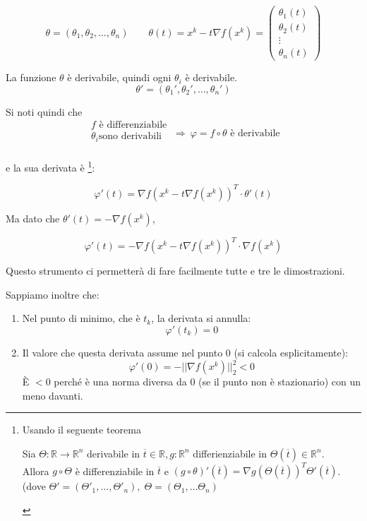 $$ \theta = (\theta_{1}, \theta_{2}, \ldots, \theta_{n}) \qquad \theta(t) = x^{k}-t\nabla f(x^{k}) =  \left(\begin{matrix}\theta_{1}(t) \\\theta_{2}(t) \\ \vdots \\ \theta_{n}(t)\end{matrix}\right)$$

La funzione $\theta$ \`e derivabile, quindi ogni $\theta_i$ \`e
derivabile.
$$ \theta' = (\theta_1', \theta_2', \ldots, \theta_{n}' )$$

Si noti quindi che
$$
\left.\begin{matrix} f \text{ \`e differenziabile}\\ \theta_i \text{
sono derivabili} \\
\end{matrix}\right. ~ \Longrightarrow ~ \varphi = f \circ \theta
\text{ \`e derivabile}
$$

e la sua derivata \`e \footnote{ Usando il seguente teorema
  \begin{theo}
    \label{theo:derivata-funzioni-composte} Sia $\Theta:\mathbb{R}
\rightarrow \mathbb{R}^{n}$ derivabile in $\overline{t}\in \mathbb{R},
g: \mathbb{R}^{n}$ differienziabile in $\Theta(\overline{t})\in
\mathbb{R}^{n}$. \\ Allora $ g \circ \Theta$ \`e differenziabile in
$\overline{t}$ e $(g \circ \theta)'(\overline{t}) = \nabla
g(\Theta(\overline{t}))^{T} \Theta'(\overline{t})$.  (dove $\Theta' =
(\Theta'_1, \ldots , \Theta'_n), \; \Theta = (\Theta_1, \ldots
\Theta_n)$
  \end{theo}}:

$$ \varphi'(t) = \nabla f(x^{k} - t \nabla f(x^k))^T \cdot \theta'(t)$$

Ma dato che $ \theta'(t) = - \nabla f(x^k)$,

\begin{equation}
\label{eq:derivata-phi} \varphi'(t) = -\nabla f(x^{k} - t \nabla
f(x^{k}))^{T} \cdot \nabla f(x^{k})
\end{equation}

Questo strumento ci permetter\`a di fare facilmente tutte e tre le
dimostrazioni.

Sappiamo inoltre che:
\begin{enumerate}
\item Nel punto di minimo, che \`e $t_k$, la derivata si annulla: $$
\varphi'(t_k) = 0$$
\item Il valore che questa derivata assume nel punto $0$ (si calcola
esplicitamente): $$\varphi'(0) = -||\nabla f(x^{k})||_{2}^{2} < 0$$ \`E
$<0$ perch\'e \`e una norma diversa da $0$ (se il punto non \`e stazionario)
con un meno davanti.
\end{enumerate}


